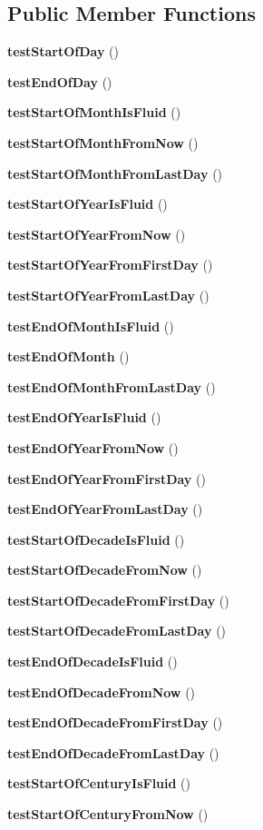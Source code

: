 \subsection*{Public Member Functions}
\begin{DoxyCompactItemize}
\item 
{\bf test\+Start\+Of\+Day} ()
\item 
{\bf test\+End\+Of\+Day} ()
\item 
{\bf test\+Start\+Of\+Month\+Is\+Fluid} ()
\item 
{\bf test\+Start\+Of\+Month\+From\+Now} ()
\item 
{\bf test\+Start\+Of\+Month\+From\+Last\+Day} ()
\item 
{\bf test\+Start\+Of\+Year\+Is\+Fluid} ()
\item 
{\bf test\+Start\+Of\+Year\+From\+Now} ()
\item 
{\bf test\+Start\+Of\+Year\+From\+First\+Day} ()
\item 
{\bf test\+Start\+Of\+Year\+From\+Last\+Day} ()
\item 
{\bf test\+End\+Of\+Month\+Is\+Fluid} ()
\item 
{\bf test\+End\+Of\+Month} ()
\item 
{\bf test\+End\+Of\+Month\+From\+Last\+Day} ()
\item 
{\bf test\+End\+Of\+Year\+Is\+Fluid} ()
\item 
{\bf test\+End\+Of\+Year\+From\+Now} ()
\item 
{\bf test\+End\+Of\+Year\+From\+First\+Day} ()
\item 
{\bf test\+End\+Of\+Year\+From\+Last\+Day} ()
\item 
{\bf test\+Start\+Of\+Decade\+Is\+Fluid} ()
\item 
{\bf test\+Start\+Of\+Decade\+From\+Now} ()
\item 
{\bf test\+Start\+Of\+Decade\+From\+First\+Day} ()
\item 
{\bf test\+Start\+Of\+Decade\+From\+Last\+Day} ()
\item 
{\bf test\+End\+Of\+Decade\+Is\+Fluid} ()
\item 
{\bf test\+End\+Of\+Decade\+From\+Now} ()
\item 
{\bf test\+End\+Of\+Decade\+From\+First\+Day} ()
\item 
{\bf test\+End\+Of\+Decade\+From\+Last\+Day} ()
\item 
{\bf test\+Start\+Of\+Century\+Is\+Fluid} ()
\item 
{\bf test\+Start\+Of\+Century\+From\+Now} ()

\end{DoxyCompactItemize}
